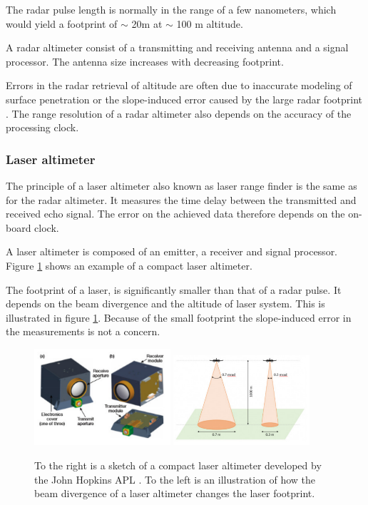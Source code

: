 The radar pulse length is normally in the range of a few nanometers, which would yield a footprint of $\sim$ 20m at $\sim$ 100 m altitude.

A radar altimeter consist of a transmitting and receiving antenna and a signal processor. The antenna size increases with decreasing footprint.

Errors in the radar retrieval of altitude are often due to inaccurate modeling
of surface penetration or the slope-induced error caused by
the large radar footprint \cite{icealti}. The range resolution of a radar altimeter also depends on the accuracy of the processing clock.


\subsubsection{Laser altimeter}

The principle of a laser altimeter also known as laser range finder is the same as for the radar altimeter. It measures the time delay between the transmitted and received echo signal. The error on the achieved data therefore depends on the on-board clock.

A laser altimeter is composed of an emitter, a receiver and signal processor. Figure \ref{alti} shows an example of a compact laser altimeter. 

The footprint of a laser, is significantly smaller than that of a radar pulse. It depends on the beam divergence and the altitude of laser system. This is illustrated in figure \ref{alti}.  Because of the small footprint the slope-induced error in the measurements is not a concern.

\begin{figure}[htb]
\begin{center}
\includegraphics[width=0.45\textwidth]{figures/navtheory/CLA}
\includegraphics[width=0.45\textwidth]{figures/navtheory/lidarfoot}
\caption{To the right is a sketch of a compact laser altimeter developed by the John Hopkins APL \cite{APLCLA}. To the left is an illustration of how the beam divergence of a laser altimeter changes the laser footprint.\cite{footprint}}
\label{alti}
\end{center}
\end{figure}

